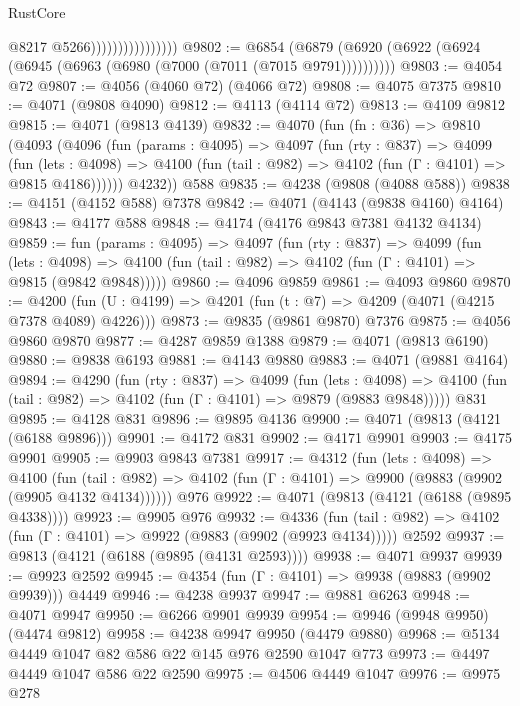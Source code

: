 \begin{lexlean}{RustCore}
\begin{coremodule}
                                    @8217
                                    @5266))))))))))))))))
@9802 := @6854 (@6879 (@6920 (@6922 (@6924 (@6945 (@6963 (@6980 (@7000 (@7011 (@7015 @9791))))))))))
@9803 := @4054 @72
@9807 := @4056 (@4060 @72) (@4066 @72)
@9808 := @4075 @7375
@9810 := @4071 (@9808 @4090)
@9812 := @4113 (@4114 @72)
@9813 := @4109 @9812
@9815 := @4071 (@9813 @4139)
@9832 := @4070
    (fun (fn : @36) =>
    @9810
      (@4093
        (@4096
          (fun (params : @4095) =>
          @4097
            (fun (rty : @837) =>
            @4099
              (fun (lets : @4098) =>
              @4100 (fun (tail : @982) => @4102 (fun (Γ : @4101) => @9815 @4186))))))
        @4232))
    @588
@9835 := @4238 (@9808 (@4088 @588))
@9838 := @4151 (@4152 @588) @7378
@9842 := @4071 (@4143 (@9838 @4160) @4164)
@9843 := @4177 @588
@9848 := @4174 (@4176 @9843 @7381 @4132 @4134)
@9859 := fun (params : @4095) =>
  @4097
    (fun (rty : @837) =>
    @4099
      (fun (lets : @4098) =>
      @4100 (fun (tail : @982) => @4102 (fun (Γ : @4101) => @9815 (@9842 @9848)))))
@9860 := @4096 @9859
@9861 := @4093 @9860
@9870 := @4200 (fun (U : @4199) => @4201 (fun (t : @7) => @4209 (@4071 (@4215 @7378 @4089) @4226)))
@9873 := @9835 (@9861 @9870) @7376
@9875 := @4056 @9860 @9870
@9877 := @4287 @9859 @1388
@9879 := @4071 (@9813 @6190)
@9880 := @9838 @6193
@9881 := @4143 @9880
@9883 := @4071 (@9881 @4164)
@9894 := @4290
    (fun (rty : @837) =>
    @4099
      (fun (lets : @4098) =>
      @4100 (fun (tail : @982) => @4102 (fun (Γ : @4101) => @9879 (@9883 @9848)))))
    @831
@9895 := @4128 @831
@9896 := @9895 @4136
@9900 := @4071 (@9813 (@4121 (@6188 @9896)))
@9901 := @4172 @831
@9902 := @4171 @9901
@9903 := @4175 @9901
@9905 := @9903 @9843 @7381
@9917 := @4312
    (fun (lets : @4098) =>
    @4100
      (fun (tail : @982) => @4102 (fun (Γ : @4101) => @9900 (@9883 (@9902 (@9905 @4132 @4134))))))
    @976
@9922 := @4071 (@9813 (@4121 (@6188 (@9895 @4338))))
@9923 := @9905 @976
@9932 := @4336
    (fun (tail : @982) => @4102 (fun (Γ : @4101) => @9922 (@9883 (@9902 (@9923 @4134)))))
    @2592
@9937 := @9813 (@4121 (@6188 (@9895 (@4131 @2593))))
@9938 := @4071 @9937
@9939 := @9923 @2592
@9945 := @4354 (fun (Γ : @4101) => @9938 (@9883 (@9902 @9939))) @4449
@9946 := @4238 @9937
@9947 := @9881 @6263
@9948 := @4071 @9947
@9950 := @6266 @9901 @9939
@9954 := @9946 (@9948 @9950) (@4474 @9812)
@9958 := @4238 @9947 @9950 (@4479 @9880)
@9968 := @5134 @4449 @1047 @82 @586 @22 @145 @976 @2590 @1047 @773
@9973 := @4497 @4449 @1047 @586 @22 @2590
@9975 := @4506 @4449 @1047
@9976 := @9975 @278

\end{coremodule}
\end{lexlean}
